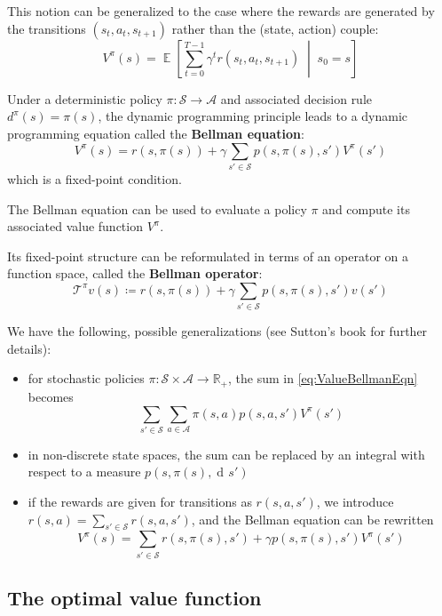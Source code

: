 \documentclass[12pt]{report}
\newcommand\RR{\mathbb{R}}
\newcommand{\scalemid}{\;\middle|\;}
\DeclareMathOperator{\EE}{\mathbb{E}}
\newcommand{\der}{\operatorname{d\!}{}}
\newcommand{\calA}{\mathcal{A}}
\newcommand{\calS}{\mathcal{S}}
\newcommand{\calT}{\mathcal{T}}
\newcommand{\bluefont}{\color{Blue}}
\begin{document}
This notion can be generalized to the case where the rewards are generated by the transitions $(s_t, a_t, s_{t+1})$ rather than the (state, action) couple:
\[
	V^\pi(s) = \EE\left[
	\sum_{t=0}^{T-1} \gamma^t r(s_t, a_t, s_{t+1})
	\scalemid s_0 = s
	\right]
\]

Under a deterministic policy $\pi\colon \calS \to \calA$ and associated decision rule $d^\pi(s) = \pi(s)$, the dynamic programming principle leads to a dynamic programming equation called the \textbf{\bluefont Bellman equation}:
\begin{equation}\label{eq:ValueBellmanEqn}
	V^\pi(s) = r(s, \pi(s)) + \gamma\sum_{s'\in\calS} p(s, \pi(s), s')V^\pi(s')
\end{equation}
which is a fixed-point condition.

The Bellman equation can be used to evaluate a policy $\pi$ and compute its associated value function $V^\pi$.

Its fixed-point structure can be reformulated in terms of an operator on a function space, called the \textbf{Bellman operator}:
\[
	\calT^\pi v(s) \coloneqq
	r(s,\pi(s)) + \gamma\sum_{s'\in\calS}p(s,\pi(s),s') v(s')
\]



\begin{remark}
We have the following, possible generalizations (see Sutton's book \cite[][chap.\ 3,4]{Sutton1998} for further details):
\begin{itemize}
	\item for stochastic policies $\pi\colon \calS\times\calA \to \RR_+$, the sum in \cref{eq:ValueBellmanEqn} becomes 
	\[
	\sum_{s'\in\calS} \sum_{a\in\calA} \pi(s,a) p(s,a,s')V^\pi(s')
	\]
	\item in non-discrete state spaces, the sum can be replaced by an integral with respect to a measure $p(s,\pi(s),\der s')$
	\item if the rewards are given for transitions as $r(s,a,s')$, we introduce $r(s,a) = \sum_{s'\in\calS}r(s,a,s')$, and the Bellman equation can be rewritten
	\[
		V^\pi(s) = \sum_{s'\in\calS}
		r(s,\pi(s),s') + \gamma p(s,\pi(s),s')V^\pi(s')
	\]
\end{itemize}
\end{remark}



\subsection{The optimal value function}\label{sec:OptimalValueFunc}
\end{document}
